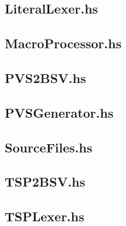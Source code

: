\subsection{LiteralLexer.hs} \label{app:bapip:hs:litlex}


\subsection{MacroProcessor.hs} \label{app:bapip:hs:macro}


\subsection{PVS2BSV.hs} \label{app:bapip:hs:pvs2bsv}


\subsection{PVSGenerator.hs} \label{app:bapip:hs:pvsgen}


\subsection{SourceFiles.hs} \label{app:bapip:hs:source}


\subsection{TSP2BSV.hs} \label{app:bapip:hs:tsp2bsv}


\subsection{TSPLexer.hs} \label{app:bapip:hs:tsplex}



